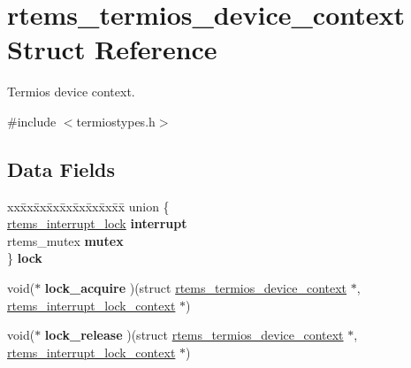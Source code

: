\hypertarget{structrtems__termios__device__context}{}\section{rtems\+\_\+termios\+\_\+device\+\_\+context Struct Reference}
\label{structrtems__termios__device__context}


Termios device context.  




{\ttfamily \#include $<$termiostypes.\+h$>$}

\subsection*{Data Fields}
\begin{DoxyCompactItemize}
\item 
\mbox{\label{structrtems__termios__device__context_a53d2632cead3fac229e331a65078c192}} 
\begin{tabbing}
xx\=xx\=xx\=xx\=xx\=xx\=xx\=xx\=xx\=\kill
union \{\\
\>\mbox{\hyperlink{group__ClassicINTRLocks_ga7d4b54b01fd1507aa842d5fbc7b11177}{rtems\_interrupt\_lock}} {\bfseries interrupt}\\
\>rtems\_mutex {\bfseries mutex}\\
\} {\bfseries lock}\\

\end{tabbing}\item 
\mbox{\label{structrtems__termios__device__context_afb27359556c9acf98e646c795e4240e4}} 
void($\ast$ {\bfseries lock\+\_\+acquire} )(struct \mbox{\hyperlink{structrtems__termios__device__context}{rtems\+\_\+termios\+\_\+device\+\_\+context}} $\ast$, \mbox{\hyperlink{group__ClassicINTRLocks_gab9d4b488f1537323799db7c1fa69b9aa}{rtems\+\_\+interrupt\+\_\+lock\+\_\+context}} $\ast$)
\item 
\mbox{\label{structrtems__termios__device__context_a536863a2a952a1c80387e0fc3848f68b}} 
void($\ast$ {\bfseries lock\+\_\+release} )(struct \mbox{\hyperlink{structrtems__termios__device__context}{rtems\+\_\+termios\+\_\+device\+\_\+context}} $\ast$, \mbox{\hyperlink{group__ClassicINTRLocks_gab9d4b488f1537323799db7c1fa69b9aa}{rtems\+\_\+interrupt\+\_\+lock\+\_\+context}} $\ast$)
\end{DoxyCompactItemize}


